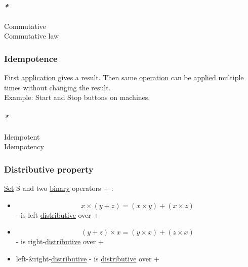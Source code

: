 \documentclass[11pt]{article}
\begin{document}
\paragraph{\emph{*}}
\label{sec:orgb90a10f}

\label{orgb53f83d}Commutative\\
\label{orgc305b6a}Commutative law\\

\subsubsection{\label{orgcf231e8}Idempotence}
\label{sec:orge351f01}
First \hyperref[org2b89e66]{application} gives a result. Then same \hyperref[org1173fe8]{operation} can be \hyperref[org7abd585]{applied} multiple times without changing the result.\\
Example: Start and Stop buttons on machines.\\

\paragraph{\emph{*}}
\label{sec:orgdd54553}

\label{orgb96d911}Idempotent\\
\label{org783950f}Idempotency\\

\subsubsection{\label{orgeb5801d}Distributive property}
\label{sec:orgc678dd7}
\hyperref[org1faf06d]{Set} S and two \hyperref[org57bd48f]{binary} operators + \texttimes{}:\\

\begin{itemize}
\item $$ x \times (y + z) = (x \times y) + (x \times z) $$ - \texttimes{} is left-\hyperref[org755ce9a]{distributive} over +\\
\item $$ (y + z) \times x = (y \times x) + (z \times x) $$ - \texttimes{} is right-\hyperref[org755ce9a]{distributive} over +\\
\item left-\&right-\hyperref[org755ce9a]{distributive} - \texttimes{} is \hyperref[org755ce9a]{distributive} over +\\
\end{itemize}
\end{document}
